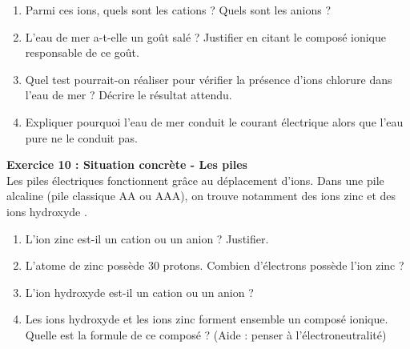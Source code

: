 \documentclass[11pt,a4paper]{article}
\newcommand{\cadreblanc}[1]{%
	\medskip\framebox[\linewidth][c]{%
		\rule{0mm}{#1mm}}\par
	\medskip}
\begin{document}
	\vspace{5mm}
	
	\begin{enumerate}
		\item Parmi ces ions, quels sont les cations ? Quels sont les anions ?
		
		\cadreblanc{20}
		
		\item L'eau de mer a-t-elle un goût salé ? Justifier en citant le composé ionique responsable de ce goût.
		
		\cadreblanc{20}
		
		\item Quel test pourrait-on réaliser pour vérifier la présence d'ions chlorure dans l'eau de mer ? Décrire le résultat attendu.
		
		\cadreblanc{25}
		
		\item Expliquer pourquoi l'eau de mer conduit le courant électrique alors que l'eau pure ne le conduit pas.
		
		\cadreblanc{25}
	\end{enumerate}
	
	\vfill
	
	\newpage
	
	\textbf{Exercice 10 : Situation concrète - Les piles} \\
	
	Les piles électriques fonctionnent grâce au déplacement d'ions. Dans une pile alcaline (pile classique AA ou AAA), on trouve notamment des ions zinc  et des ions hydroxyde .
	
	\vspace{5mm}
	
	\begin{enumerate}
		\item L'ion zinc est-il un cation ou un anion ? Justifier.
		
		\cadreblanc{20}
		
		\item L'atome de zinc possède 30 protons. Combien d'électrons possède l'ion zinc  ?
		
		\cadreblanc{20}
		
		\item L'ion hydroxyde  est-il un cation ou un anion ?
		
		\cadreblanc{15}
		
		\item Les ions hydroxyde et les ions zinc forment ensemble un composé ionique. Quelle est la formule de ce composé ? (Aide : penser à l'électroneutralité)
		
		\cadreblanc{25}
	\end{enumerate}
	
\end{document}
